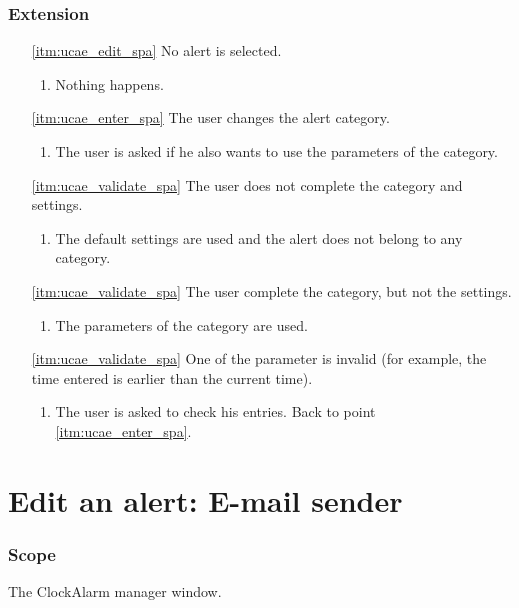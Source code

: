 \subsubsection{Extension}
\begin{enumerate}
	\item[\ref{itm:ucae_edit_spa}] No alert is selected.
	\begin{enumerate}[i]
		\item Nothing happens.
	\end{enumerate}
	
	\item[\ref{itm:ucae_enter_spa}] The user changes the alert category.
	\begin{enumerate}[i]
		\item The user is asked if he also wants to use the parameters of the category.
	\end{enumerate}
	
	\item[\ref{itm:ucae_validate_spa}] The user does not complete the category and settings.
	\begin{enumerate}[i]
		\item The default settings are used and the alert does not belong to any category.
	\end{enumerate}
	
	\item[\ref{itm:ucae_validate_spa}] The user complete the category, but not the settings.
	\begin{enumerate}[i]
		\item The parameters of the category are used.
	\end{enumerate}
	
	\item[\ref{itm:ucae_validate_spa}] One of the parameter is invalid (for example, the time entered is earlier than the current time).
	\begin{enumerate}[i]
		\item The user is asked to check his entries. Back to point \ref{itm:ucae_enter_spa}.
	\end{enumerate}
\end{enumerate}

\section{Edit an alert: E-mail sender}\label{subsec:usecase_edit_email_sender}

\subsubsection{Scope}
The ClockAlarm manager window.
